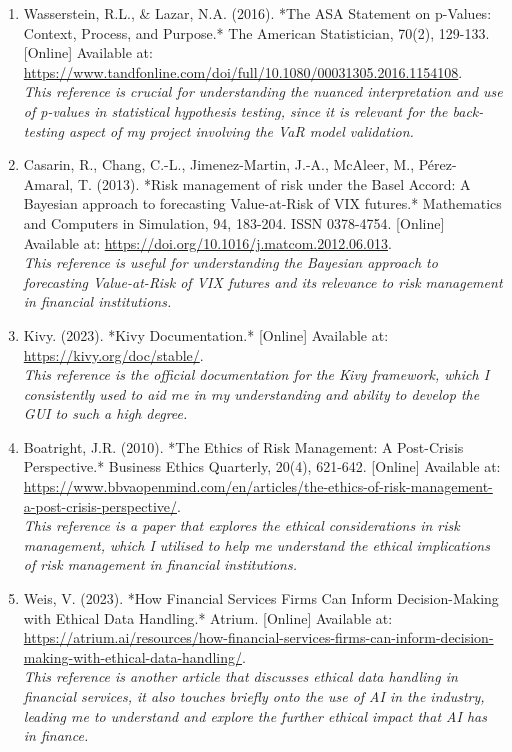\documentclass{article}
\begin{document}
\begin{small}
\begin{enumerate}
  \item\label{ref11} Wasserstein, R.L., \& Lazar, N.A. (2016). *The ASA Statement on p-Values: Context, Process, and Purpose.* The American Statistician, 70(2), 129-133. [Online] Available at: \url{https://www.tandfonline.com/doi/full/10.1080/00031305.2016.1154108}.
  \\\textit{This reference is crucial for understanding the nuanced interpretation and use of p-values in statistical hypothesis testing, since it is  relevant for the back-testing aspect of my project involving the VaR model validation.}

  \item\label{ref12} Casarin, R., Chang, C.-L., Jimenez-Martin, J.-A., McAleer, M., Pérez-Amaral, T. (2013). *Risk management of risk under the Basel Accord: A Bayesian approach to forecasting Value-at-Risk of VIX futures.* Mathematics and Computers in Simulation, 94, 183-204. ISSN 0378-4754. [Online] Available at: \url{https://doi.org/10.1016/j.matcom.2012.06.013}.
  \\\textit{This reference is useful for understanding the Bayesian approach to forecasting Value-at-Risk of VIX futures and its relevance to risk management in financial institutions.}

  \item\label{ref13} Kivy. (2023). *Kivy Documentation.* [Online] Available at: \url{https://kivy.org/doc/stable/}.
  \\\textit{This reference is the official documentation for the Kivy framework, which I consistently used to aid me in my understanding and ability to develop the GUI to such a high degree.}
  
  \item\label{ref14} Boatright, J.R. (2010). *The Ethics of Risk Management: A Post-Crisis Perspective.* Business Ethics Quarterly, 20(4), 621-642. [Online] Available at: \url{https://www.bbvaopenmind.com/en/articles/the-ethics-of-risk-management-a-post-crisis-perspective/}.
  \\\textit{This reference is a paper that explores the ethical considerations in risk management, which I utilised to help me understand the ethical implications of risk management in financial institutions.}

  \item\label{ref15} Weis, V. (2023). *How Financial Services Firms Can Inform Decision-Making with Ethical Data Handling.* Atrium. [Online] Available at: \url{https://atrium.ai/resources/how-financial-services-firms-can-inform-decision-making-with-ethical-data-handling/}.
  \\\textit{This reference is another article that discusses ethical data handling in financial services, it also touches briefly onto the use of AI in the industry, leading me to understand and explore the further ethical impact that AI has in finance.}


\end{enumerate}
\end{small}
\end{document}
